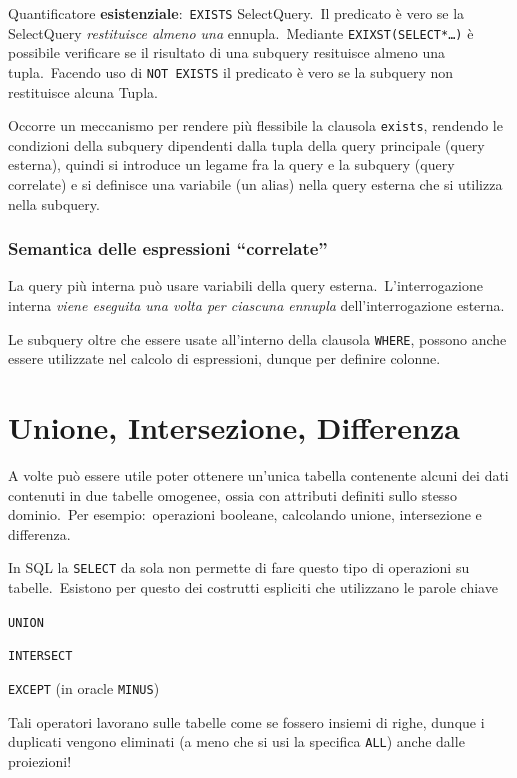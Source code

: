 Quantificatore \textbf{esistenziale}:\ \texttt{EXISTS} SelectQuery.\
Il predicato è vero se la SelectQuery \textit{restituisce almeno una} ennupla.\
Mediante \texttt{EXIXST(SELECT*\dots)} è possibile verificare se il risultato di una subquery resituisce almeno una tupla.\
Facendo uso di \texttt{NOT EXISTS} il predicato è vero se la subquery non restituisce alcuna Tupla.

Occorre un meccanismo per rendere più flessibile la clausola \texttt{exists}, rendendo le condizioni della subquery dipendenti dalla tupla della query principale (query esterna), quindi si introduce un legame fra la query e la subquery (query correlate) e si definisce una variabile (un alias) nella query esterna che si utilizza nella subquery.

\subsubsection{Semantica delle espressioni ``correlate''}

La query più interna può usare variabili della query esterna.\
L'interrogazione interna \textit{viene eseguita una volta per ciascuna ennupla} dell'interrogazione esterna.

Le subquery oltre che essere usate all'interno della clausola \texttt{WHERE}, possono anche essere utilizzate nel calcolo di espressioni, dunque per definire colonne.\

\section{Unione, Intersezione, Differenza}

A volte può essere utile poter ottenere un'unica tabella contenente alcuni dei dati contenuti in due tabelle omogenee, ossia con attributi definiti sullo stesso dominio.\
Per esempio:\ operazioni booleane, calcolando unione, intersezione e differenza.

In SQL la \texttt{SELECT} da sola non permette di fare questo tipo di operazioni su tabelle.\
Esistono per questo dei costrutti espliciti che utilizzano le parole chiave

\begin{flushleft}
	\texttt{UNION}

	\texttt{INTERSECT}

	\texttt{EXCEPT} (in oracle \texttt{MINUS})
\end{flushleft}
Tali operatori lavorano sulle tabelle come se fossero insiemi di righe, dunque i duplicati vengono eliminati (a meno che si usi la specifica \texttt{ALL}) anche dalle proiezioni!

